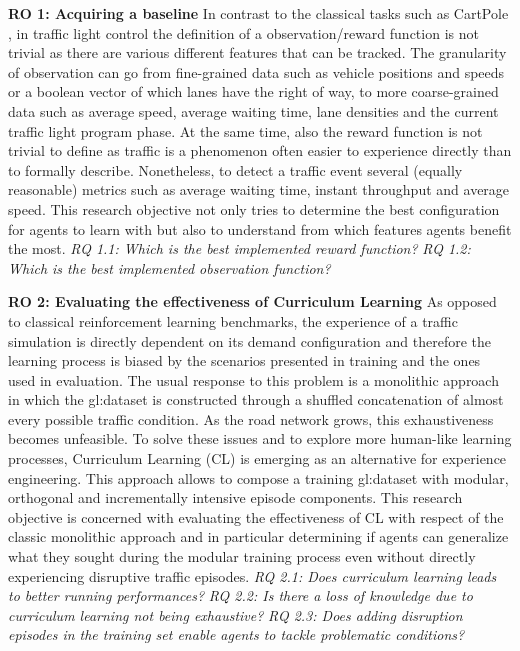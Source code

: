 \hfill \break
\noindent
\textbf{\hypertarget{ro1}{RO 1}: Acquiring a baseline}
\hfill \break
In contrast to the classical tasks such as CartPole \cite{nagendra2017comparison}, in traffic light control the definition of a observation/reward function is not trivial as there are various different features that can be tracked.
The granularity of observation can go from fine-grained data such as vehicle positions and speeds or a boolean vector of which lanes have the right of way, to more coarse-grained data such as average speed, average waiting time, lane densities and the current traffic light program phase.
At the same time, also the reward function is not trivial to define as traffic is a phenomenon often easier to experience directly than to formally describe.
Nonetheless, to detect a traffic event several (equally reasonable) metrics such as average waiting time, instant throughput and average speed.
This research objective not only tries to determine the best configuration for agents to learn with but also to understand from which features agents benefit the most.
\hfill \break
\textit{\hypertarget{rq1.1}{RQ 1.1}: Which is the best implemented reward function?}
\hfill \break
\textit{\hypertarget{rq1.2}{RQ 1.2}: Which is the best implemented observation function?}

\hfill \break
\noindent
\textbf{\hypertarget{ro2}{RO 2}: Evaluating the effectiveness of Curriculum Learning}
\hfill \break
As opposed to classical reinforcement learning benchmarks, the experience of a traffic simulation is directly dependent on its demand configuration and therefore the learning process is biased by the scenarios presented in training and the ones used in evaluation.
The usual response to this problem is a monolithic approach in which the \gls{gl:dataset} is constructed through a shuffled concatenation of almost every possible traffic condition.
As the road network grows, this exhaustiveness becomes unfeasible.
To solve these issues and to explore more human-like learning processes, Curriculum Learning (CL) is emerging as an alternative for experience engineering.
This approach allows to compose a training \gls{gl:dataset} with modular, orthogonal and incrementally intensive episode components.
This research objective is concerned with evaluating the effectiveness of CL with respect of the classic monolithic approach and in particular determining if agents can generalize what they sought during the modular training process even without directly experiencing disruptive traffic episodes.
\hfill \break
\textit{\hypertarget{rq2.1}{RQ 2.1}: Does curriculum learning leads to better running performances?}
\hfill \break
\textit{\hypertarget{rq2.2}{RQ 2.2}: Is there a loss of knowledge due to curriculum learning not being exhaustive?}
\hfill \break
\textit{\hypertarget{rq2.3}{RQ 2.3}: Does adding disruption episodes in the training set enable agents to tackle problematic conditions?}

